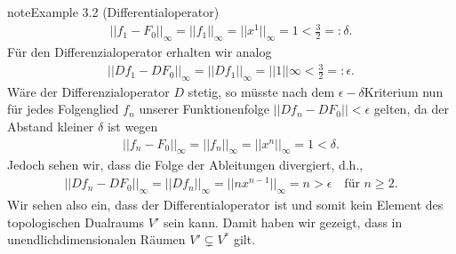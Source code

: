 \documentclass[letterpaper,10pt,english]{jupyterBook}
\begin{document}
\begin{sphinxadmonition}{note}{Example 3.2 (Differentialoperator)}
\begin{equation*}
\begin{split}||f_1 - F_0||_\infty = ||f_1||_\infty = ||x^1||_\infty = 1 < \frac{3}{2} =: \delta.\end{split}
\end{equation*}
\sphinxAtStartPar
Für den Differenzialoperator erhalten wir analog
\begin{equation*}
\begin{split}||Df_1 - DF_0||_\infty = ||Df_1||_\infty = ||1||\infty < \frac{3}{2} =: \epsilon.\end{split}
\end{equation*}
\sphinxAtStartPar
Wäre der Differenzialoperator \(D\) stetig, so müsste nach dem \(\epsilon-\delta\)\sphinxhyphen{}Kriterium nun für jedes Folgenglied \(f_n\) unserer Funktionenfolge \(||Df_n - DF_0|| < \epsilon\) gelten, da der Abstand kleiner \(\delta\) ist wegen
\begin{equation*}
\begin{split}||f_n - F_0||_\infty = ||f_n||_\infty = ||x^n||_\infty = 1 < \delta.\end{split}
\end{equation*}
\sphinxAtStartPar
Jedoch sehen wir, dass die Folge der Ableitungen divergiert, d.h.,
\begin{equation*}
\begin{split}||Df_n - DF_0||_\infty = ||Df_n||_\infty = ||nx^{n-1}||_\infty = n > \epsilon \quad \text{für } n\geq 2.\end{split}
\end{equation*}
\sphinxAtStartPar
Wir sehen also ein, dass der Differentialoperator  ist und somit kein Element des topologischen Dualraums \(V'\) sein kann.
Damit haben wir gezeigt, dass in unendlich\sphinxhyphen{}dimensionalen Räumen \(V' \subsetneq V^\ast\) gilt.
\end{sphinxadmonition}
\end{document}
